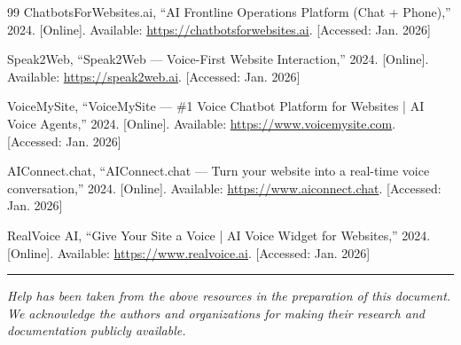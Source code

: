 \begin{thebibliography}{99}
ChatbotsForWebsites.ai, ``AI Frontline Operations Platform (Chat + Phone),'' 2024. [Online]. Available: \url{https://chatbotsforwebsites.ai}. [Accessed: Jan. 2026]

Speak2Web, ``Speak2Web --- Voice-First Website Interaction,'' 2024. [Online]. Available: \url{https://speak2web.ai}. [Accessed: Jan. 2026]

VoiceMySite, ``VoiceMySite --- \#1 Voice Chatbot Platform for Websites | AI Voice Agents,'' 2024. [Online]. Available: \url{https://www.voicemysite.com}. [Accessed: Jan. 2026]

AIConnect.chat, ``AIConnect.chat --- Turn your website into a real-time voice conversation,'' 2024. [Online]. Available: \url{https://www.aiconnect.chat}. [Accessed: Jan. 2026]

RealVoice AI, ``Give Your Site a Voice | AI Voice Widget for Websites,'' 2024. [Online]. Available: \url{https://www.realvoice.ai}. [Accessed: Jan. 2026]

\end{thebibliography}

\vspace{1cm}

\noindent\textcolor{gray}{\rule{\textwidth}{0.5pt}}

\vspace{0.5cm}

\noindent\textit{\small Help has been taken from the above resources in the preparation of this document. We acknowledge the authors and organizations for making their research and documentation publicly available.}
